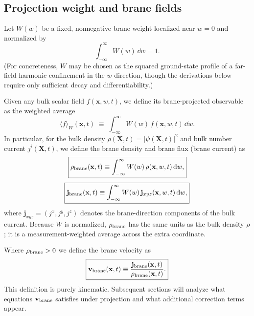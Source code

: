 \documentclass[11pt]{article}
\begin{document}
\subsection{Projection weight and brane fields}
\label{sec:projection-defs}

Let $W(w)$ be a fixed, nonnegative brane weight localized near $w=0$ and normalized by
\begin{equation}
\int_{-\infty}^{\infty} W(w)\,\dd w = 1.
\label{eq:Wnorm}
\end{equation}
(For concreteness, $W$ may be chosen as the squared ground-state profile of a far-field harmonic confinement in the $w$ direction, though the derivations below require only sufficient decay and differentiability.)

Given any bulk scalar field $f(\mathbf{x},w,t)$, we define its brane-projected observable as the weighted average
\begin{equation}
\langle f\rangle_W(\mathbf{x},t)\;\equiv\;\int_{-\infty}^{\infty} W(w)\,f(\mathbf{x},w,t)\,\dd w.
\label{eq:Wavg}
\end{equation}
In particular, for the bulk density $\rho(\mathbf{X},t)=|\psi(\mathbf{X},t)|^2$ and bulk number current $j^i(\mathbf{X},t)$, we define the brane density and brane flux (brane current) as
\begin{equation}
\boxed{
\rho_{\rm brane}(\mathbf{x},t)
\equiv
\int_{-\infty}^{\infty} W(w)\,\rho(\mathbf{x},w,t)\,\dd w,
}
\label{eq:rhobrane}
\end{equation}
\begin{equation}
\boxed{
\mathbf{j}_{\rm brane}(\mathbf{x},t)
\equiv
\int_{-\infty}^{\infty} W(w)\,\mathbf{j}_{xyz}(\mathbf{x},w,t)\,\dd w,
}
\label{eq:jbrane}
\end{equation}
where $\mathbf{j}_{xyz}=(j^x,j^y,j^z)$ denotes the brane-direction components of the bulk current.
Because $W$ is normalized, $\rho_{\rm brane}$ has the same units as the bulk density $\rho$; it is a measurement-weighted average across the extra coordinate.

Where $\rho_{\rm brane}>0$ we define the brane velocity as
\begin{equation}
\boxed{
\mathbf{v}_{\rm brane}(\mathbf{x},t)\equiv
\frac{\mathbf{j}_{\rm brane}(\mathbf{x},t)}{\rho_{\rm brane}(\mathbf{x},t)}.
}
\label{eq:vbrane}
\end{equation}
This definition is purely kinematic. Subsequent sections will analyze what equations $\mathbf{v}_{\rm brane}$ satisfies under projection and what additional correction terms appear.
\end{document}

